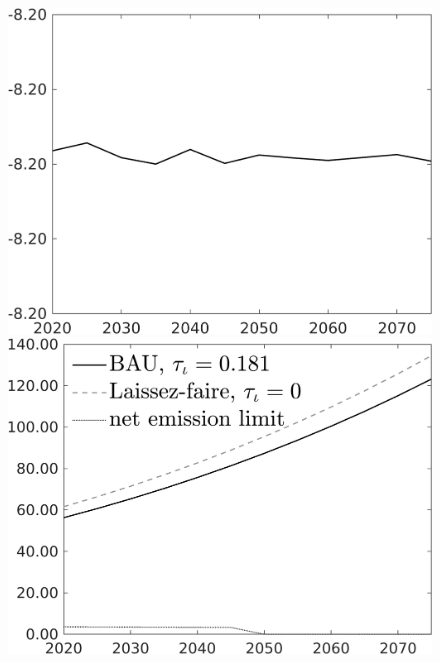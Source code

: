 \documentclass[12pt]{article}
\begin{document}
\begin{figure}[h!!]
\begin{minipage}[]{0.32\textwidth}
	\end{minipage}	
	\begin{minipage}[]{0.32\textwidth}
		\includegraphics[width=1\textwidth]{../../codding_model/own_basedOnFried/optimalPol_010922_revision/figures/all_13Sept22/CompTaul_LFBAUPer_Reg0_C_spillover0_nsk1_xgr0_knspil0_sep1_countec0_GovRev0_etaa0.79.png}
	\end{minipage}	
	\begin{minipage}[]{0.32\textwidth}
		\includegraphics[width=1\textwidth]{../../codding_model/own_basedOnFried/optimalPol_010922_revision/figures/all_13Sept22/CompTaul_LFBAU_Reg0_Emnet_spillover0_nsk1_xgr0_knspil0_sep1_countec0_GovRev0_etaa0.79_lgd1.png}

\end{minipage}
\end{figure}
\end{document}
